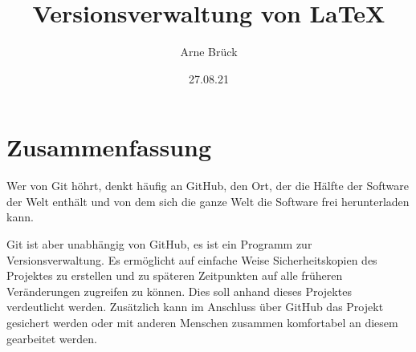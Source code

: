 \documentclass[11pt]{article}
\title{Versionsverwaltung von \LaTeX{}}
\author{Arne Brück}
\date{27.08.21}
\begin{document}
\maketitle

\section{Zusammenfassung}
Wer von Git höhrt, denkt häufig an GitHub, den Ort, der die Hälfte der
Software der Welt enthält und von dem sich die ganze Welt die Software
frei herunterladen kann.

Git ist aber unabhängig von GitHub, es ist ein Programm zur
Versionsverwaltung. Es ermöglicht auf einfache Weise Sicherheitskopien
des Projektes zu erstellen und zu späteren Zeitpunkten auf alle
früheren Veränderungen zugreifen zu können. Dies soll anhand dieses
Projektes verdeutlicht werden. Zusätzlich kann im Anschluss über
GitHub das Projekt gesichert werden oder mit anderen Menschen zusammen
komfortabel an diesem gearbeitet werden.
\end{document}
